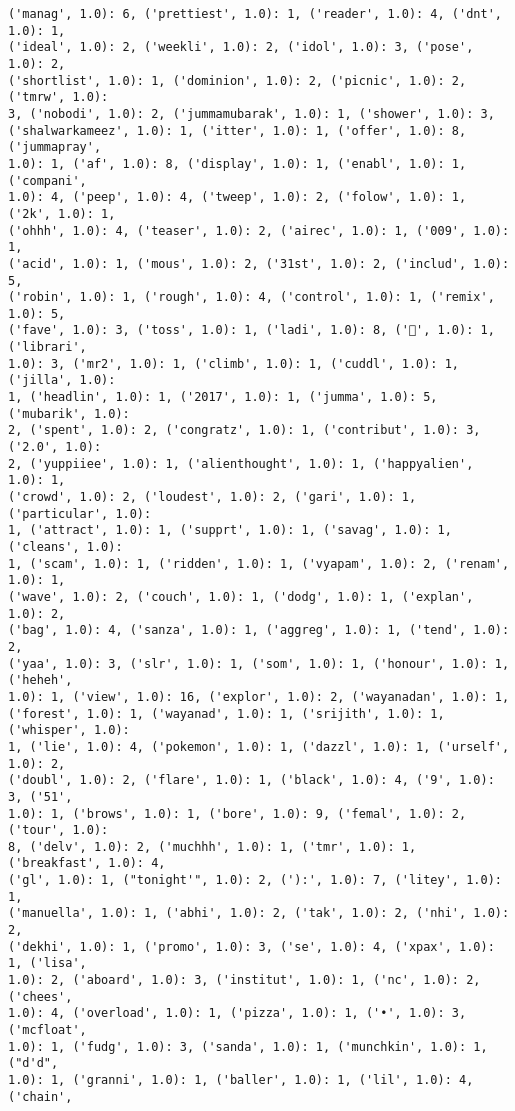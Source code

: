 \documentclass[11pt]{article}
\begin{document}
\begin{Verbatim}[commandchars=\\\{\}]
('manag', 1.0): 6, ('prettiest', 1.0): 1, ('reader', 1.0): 4, ('dnt', 1.0): 1,
('ideal', 1.0): 2, ('weekli', 1.0): 2, ('idol', 1.0): 3, ('pose', 1.0): 2,
('shortlist', 1.0): 1, ('dominion', 1.0): 2, ('picnic', 1.0): 2, ('tmrw', 1.0):
3, ('nobodi', 1.0): 2, ('jummamubarak', 1.0): 1, ('shower', 1.0): 3,
('shalwarkameez', 1.0): 1, ('itter', 1.0): 1, ('offer', 1.0): 8, ('jummapray',
1.0): 1, ('af', 1.0): 8, ('display', 1.0): 1, ('enabl', 1.0): 1, ('compani',
1.0): 4, ('peep', 1.0): 4, ('tweep', 1.0): 2, ('folow', 1.0): 1, ('2k', 1.0): 1,
('ohhh', 1.0): 4, ('teaser', 1.0): 2, ('airec', 1.0): 1, ('009', 1.0): 1,
('acid', 1.0): 1, ('mous', 1.0): 2, ('31st', 1.0): 2, ('includ', 1.0): 5,
('robin', 1.0): 1, ('rough', 1.0): 4, ('control', 1.0): 1, ('remix', 1.0): 5,
('fave', 1.0): 3, ('toss', 1.0): 1, ('ladi', 1.0): 8, ('🐑', 1.0): 1, ('librari',
1.0): 3, ('mr2', 1.0): 1, ('climb', 1.0): 1, ('cuddl', 1.0): 1, ('jilla', 1.0):
1, ('headlin', 1.0): 1, ('2017', 1.0): 1, ('jumma', 1.0): 5, ('mubarik', 1.0):
2, ('spent', 1.0): 2, ('congratz', 1.0): 1, ('contribut', 1.0): 3, ('2.0', 1.0):
2, ('yuppiiee', 1.0): 1, ('alienthought', 1.0): 1, ('happyalien', 1.0): 1,
('crowd', 1.0): 2, ('loudest', 1.0): 2, ('gari', 1.0): 1, ('particular', 1.0):
1, ('attract', 1.0): 1, ('supprt', 1.0): 1, ('savag', 1.0): 1, ('cleans', 1.0):
1, ('scam', 1.0): 1, ('ridden', 1.0): 1, ('vyapam', 1.0): 2, ('renam', 1.0): 1,
('wave', 1.0): 2, ('couch', 1.0): 1, ('dodg', 1.0): 1, ('explan', 1.0): 2,
('bag', 1.0): 4, ('sanza', 1.0): 1, ('aggreg', 1.0): 1, ('tend', 1.0): 2,
('yaa', 1.0): 3, ('slr', 1.0): 1, ('som', 1.0): 1, ('honour', 1.0): 1, ('heheh',
1.0): 1, ('view', 1.0): 16, ('explor', 1.0): 2, ('wayanadan', 1.0): 1,
('forest', 1.0): 1, ('wayanad', 1.0): 1, ('srijith', 1.0): 1, ('whisper', 1.0):
1, ('lie', 1.0): 4, ('pokemon', 1.0): 1, ('dazzl', 1.0): 1, ('urself', 1.0): 2,
('doubl', 1.0): 2, ('flare', 1.0): 1, ('black', 1.0): 4, ('9', 1.0): 3, ('51',
1.0): 1, ('brows', 1.0): 1, ('bore', 1.0): 9, ('femal', 1.0): 2, ('tour', 1.0):
8, ('delv', 1.0): 2, ('muchhh', 1.0): 1, ('tmr', 1.0): 1, ('breakfast', 1.0): 4,
('gl', 1.0): 1, ("tonight'", 1.0): 2, ('):', 1.0): 7, ('litey', 1.0): 1,
('manuella', 1.0): 1, ('abhi', 1.0): 2, ('tak', 1.0): 2, ('nhi', 1.0): 2,
('dekhi', 1.0): 1, ('promo', 1.0): 3, ('se', 1.0): 4, ('xpax', 1.0): 1, ('lisa',
1.0): 2, ('aboard', 1.0): 3, ('institut', 1.0): 1, ('nc', 1.0): 2, ('chees',
1.0): 4, ('overload', 1.0): 1, ('pizza', 1.0): 1, ('•', 1.0): 3, ('mcfloat',
1.0): 1, ('fudg', 1.0): 3, ('sanda', 1.0): 1, ('munchkin', 1.0): 1, ("d'd",
1.0): 1, ('granni', 1.0): 1, ('baller', 1.0): 1, ('lil', 1.0): 4, ('chain',

\end{Verbatim}
\end{document}
